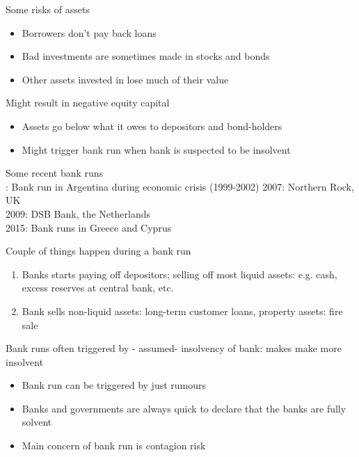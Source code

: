 \documentclass{beamer}
\begin{document}
\begin{frame}
 Some risks of assets
\begin{itemize}
  \item Borrowers don't pay back loans
  \item Bad investments are sometimes made in stocks and bonds
  \item Other assets invested in lose much of their value
\end{itemize}
\medskip
 Might result in negative equity capital
 \begin{itemize}
   \item Assets go below what it owes to depositors and bond-holders
   \item Might trigger bank run when bank is suspected to be insolvent
 \end{itemize}  
\end{frame}

\begin{frame}
 Some recent bank runs\\
 : Bank run in Argentina during economic crisis (1999-2002)
 2007: Northern Rock, UK\\
 2009: DSB Bank, the Netherlands\\
 2015: Bank runs in Greece and Cyprus
\end{frame}

\begin{frame}
  Couple of things happen during a bank run 
\begin{enumerate}
  \item Banks starts paying off depositors; selling off most liquid assets: e.g. cash, excess reserves at central bank, etc.
  \item Bank sells non-liquid assets: long-term customer loans, property assets: fire sale
\end{enumerate}
 \medskip
 Bank runs often triggered by - assumed- insolvency of bank: makes make more insolvent
 \begin{itemize}
   \item Bank run can be triggered by just rumours
   \item Banks and governments are always quick to declare that the banks are fully solvent
   \item Main concern of bank run is contagion risk
 \end{itemize}
\end{frame}
\end{document}
